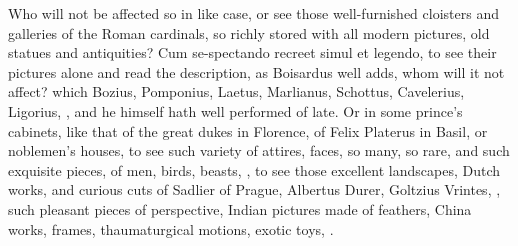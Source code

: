 {Who will not be affected so in like case, or see those well-furnished
cloisters and galleries of the Roman cardinals, so richly stored with
all modern pictures, old statues and antiquities? Cum se-spectando
recreet simul et legendo, to see their pictures alone and read the
description, as Boisardus well adds, whom will it not affect?
which Bozius, Pomponius, Laetus, Marlianus, Schottus, Cavelerius,
Ligorius, \etc{}, and he himself hath well performed of late. Or in some
prince's cabinets, like that of the great dukes in Florence, of Felix
Platerus in Basil, or noblemen's houses, to see such variety of
attires, faces, so many, so rare, and such exquisite pieces, of men,
birds, beasts, \etc{}, to see those excellent landscapes, Dutch works, and
curious cuts of Sadlier of Prague, Albertus Durer, Goltzius Vrintes,
\etc{}, such pleasant pieces of perspective, Indian pictures made of
feathers, China works, frames, thaumaturgical motions, exotic toys, \etc{}.

}
